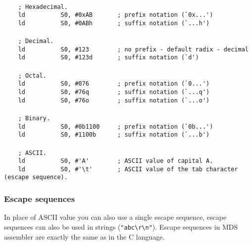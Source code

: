         ~\\
        \verb"    ; Hexadecimal."\\
        \verb"    ld          S0, #0xAB       ; prefix notation (`0x...')"\\
        \verb"    ld          S0, #0ABh       ; suffix notation (`...h')"\\
        \verb""\\
        \verb"    ; Decimal."\\
        \verb"    ld          S0, #123        ; no prefix - default radix - decimal"\\
        \verb"    ld          S0, #123d       ; suffix notation (`d')"\\
        \verb""\\
        \verb"    ; Octal."\\
        \verb"    ld          S0, #076        ; prefix notation (`0...')"\\
        \verb"    ld          S0, #76q        ; suffix notation (`...q')"\\
        \verb"    ld          S0, #76o        ; suffix notation (`...o')"\\
        \verb""\\
        \verb"    ; Binary."\\
        \verb"    ld          S0, #0b1100     ; prefix notation (`0b...')"\\
        \verb"    ld          S0, #1100b      ; suffix notation (`...b')"\\
        \verb""\\
        \verb"    ; ASCII."\\
        \verb"    ld          S0, #'A'        ; ASCII value of capital A."\\
        \verb"    ld          S0, #'\t'       ; ASCII value of the tab character (escape sequence)."

        \subsubsection{Escape sequences}
             \label{Escape sequences}
            In place of ASCII value you can also use a single escape sequence, escape sequences can also be used in strings (\verb'"abc\r\n"'). Escape sequences in MDS assembler are exactly the same as in the C language.


